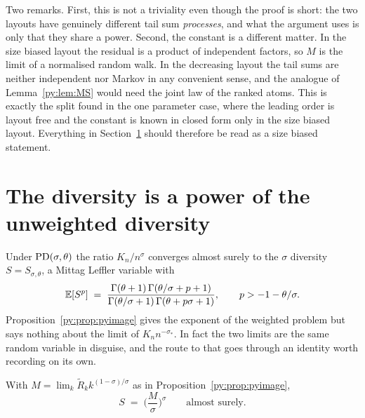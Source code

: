 Two remarks. First, this is not a triviality even though the proof is short: the two layouts have
genuinely different tail sum \emph{processes}, and what the argument uses is only that they share a
power. Second, the constant is a different matter. In the size biased layout the residual is a product of independent factors, so $M$ is the limit of
a normalised random walk. In the decreasing layout the tail sums are neither independent nor Markov
in any convenient sense, and the analogue of Lemma~\ref{py:lem:MS} would need the joint law of the
ranked atoms. This is exactly the split found in
the one parameter case, where the leading order is layout free and the constant is known in closed
form only in the size biased layout. Everything in Section~\ref{py:sec:diversity} should therefore be
read as a size biased statement.

\section{The diversity is a power of the unweighted diversity}
\label{py:sec:diversity}

Under $\mathrm{PD}(\sigma,\theta)$ the ratio $K_n/n^{\sigma}$ converges almost surely to the
$\sigma$ diversity $S = S_{\sigma,\theta}$, a Mittag Leffler variable with
\begin{equation}
\mathbb{E}[S^{p}] \;=\; \frac{\Gamma(\theta+1)\,\Gamma(\theta/\sigma+p+1)}
{\Gamma(\theta/\sigma+1)\,\Gamma(\theta+p\sigma+1)} ,
\qquad p > -1-\theta/\sigma .
\label{py:eq:mlmoments}
\end{equation}
Proposition~\ref{py:prop:pyimage} gives the exponent of the weighted problem but says nothing about
the limit of $K_n n^{-\sigma_*}$. In fact the two limits are the same random variable in disguise,
and the route to that goes through an identity worth recording on its own.

\begin{lemma}
\label{py:lem:MS}
With $M = \lim_k \widetilde R_k k^{(1-\sigma)/\sigma}$ as in Proposition~\ref{py:prop:pyimage},
\[
S \;=\; \Big(\frac{M}{\sigma}\Big)^{\sigma}
\qquad\text{almost surely.}
\]
\end{lemma}

